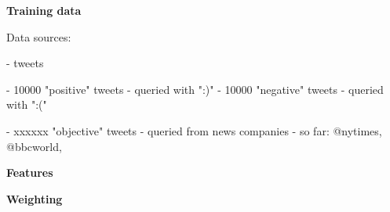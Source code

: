 



\textbf{Training data}

Data sources:

- tweets

- 10000 "positive" tweets - queried with ":)"
- 10000 "negative" tweets - queried with ":("

- xxxxxx "objective" tweets - queried from news companies - so far: @nytimes, @bbcworld,


\textbf{Features}





\textbf{Weighting}





